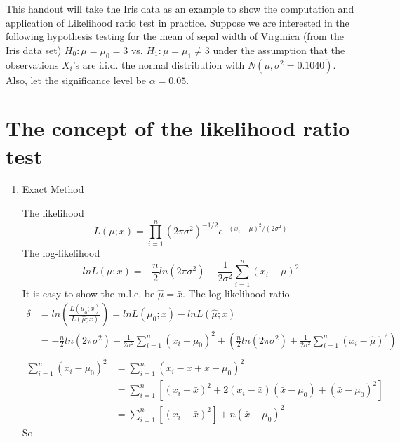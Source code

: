 This handout will take the Iris data as an example to show the computation and application of Likelihood ratio test in practice. Suppose we are interested in the following hypothesis testing for the mean of sepal width of Virginica (from the Iris data set) $H_0:\mu = \mu_0 = 3$ vs. $H_1: \mu = \mu_1 \ne 3$ under the assumption that the observations $X_i$'s are i.i.d. the normal distribution with $N(\mu, \sigma^2 = 0.1040)$. Also, let the significance level be $\alpha = 0.05$.
\section{The concept of the likelihood ratio test}
\begin{enumerate}
	\item Exact Method
		\par The likelihood 
		\begin{equation*}
			L(\mu;\underline{x}) = \prod_{i=1}^{n}(2\pi\sigma^2)^{-1/2}e^{-(x_i-\mu)^2/(2\sigma^2)}
		\end{equation*}
		The log-likelihood
		\begin{equation}
			lnL(\mu;\underline{x}) = -\frac{n}{2}ln(2\pi\sigma^2)-\frac{1}{2\sigma^2}\sum_{i=1}^{n}(x_i-\mu)^2
		\end{equation}
		It is easy to show the m.l.e. be $\hat{\mu} = \bar{x}$. The log-likelihood ratio
		\begin{equation*}
			\begin{split}
				\delta &= ln( \frac{L(\mu_0;\underline{x})}{L(\hat{\mu};\underline{x})} ) = lnL(\mu_0;\underline{x}) - lnL(\hat{\mu};\underline{x}) \\
				& = -\frac{n}{2}ln(2\pi\sigma^2)-\frac{1}{2\sigma^2}\sum_{i=1}^{n}(x_i-\mu_0)^2 + (\frac{n}{2}ln(2\pi\sigma^2) + \frac{1}{2\sigma^2}\sum_{i=1}^{n}(x_i-\hat{\mu})^2) \\
			\end{split}
		\end{equation*}
		\begin{equation*}
			\begin{split}
				\sum_{i=1}^{n}(x_i-\mu_0)^2 & = \sum_{i=1}^{n}(x_i - \bar{x} + \bar{x} -\mu_0)^2 \\
				& = \sum_{i=1}^{n} [(x_i - \bar{x})^2 + 2(x_i - \bar{x})(\bar{x} - \mu_0) + (\bar{x} - \mu_0)^2] \\
				& = \sum_{i=1}^{n} [(x_i - \bar{x})^2] + n(\bar{x} - \mu_0)^2
			\end{split}
		\end{equation*}
		So
		\begin{equation*}

\end{equation*}
\end{enumerate}
